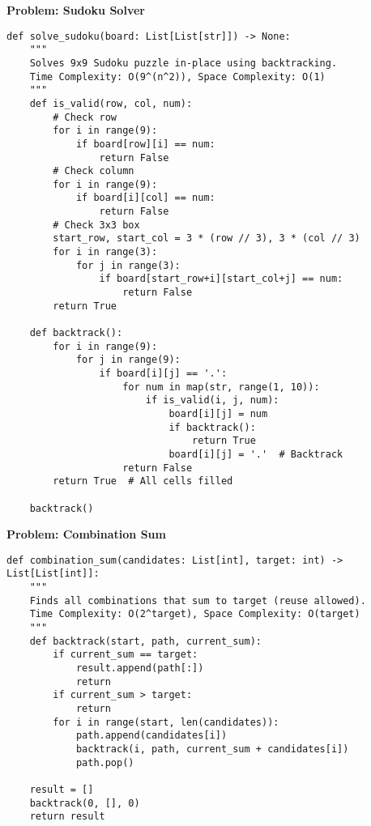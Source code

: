 \noindent\textbf{Problem: Sudoku Solver}
\begin{verbatim}
def solve_sudoku(board: List[List[str]]) -> None:
    """
    Solves 9x9 Sudoku puzzle in-place using backtracking.
    Time Complexity: O(9^(n^2)), Space Complexity: O(1)
    """
    def is_valid(row, col, num):
        # Check row
        for i in range(9):
            if board[row][i] == num:
                return False
        # Check column
        for i in range(9):
            if board[i][col] == num:
                return False
        # Check 3x3 box
        start_row, start_col = 3 * (row // 3), 3 * (col // 3)
        for i in range(3):
            for j in range(3):
                if board[start_row+i][start_col+j] == num:
                    return False
        return True
        
    def backtrack():
        for i in range(9):
            for j in range(9):
                if board[i][j] == '.':
                    for num in map(str, range(1, 10)):
                        if is_valid(i, j, num):
                            board[i][j] = num
                            if backtrack():
                                return True
                            board[i][j] = '.'  # Backtrack
                    return False
        return True  # All cells filled
        
    backtrack()
\end{verbatim}

\noindent\textbf{Problem: Combination Sum}
\begin{verbatim}
def combination_sum(candidates: List[int], target: int) -> List[List[int]]:
    """
    Finds all combinations that sum to target (reuse allowed).
    Time Complexity: O(2^target), Space Complexity: O(target)
    """
    def backtrack(start, path, current_sum):
        if current_sum == target:
            result.append(path[:])
            return
        if current_sum > target:
            return
        for i in range(start, len(candidates)):
            path.append(candidates[i])
            backtrack(i, path, current_sum + candidates[i])
            path.pop()
            
    result = []
    backtrack(0, [], 0)
    return result
\end{verbatim}

